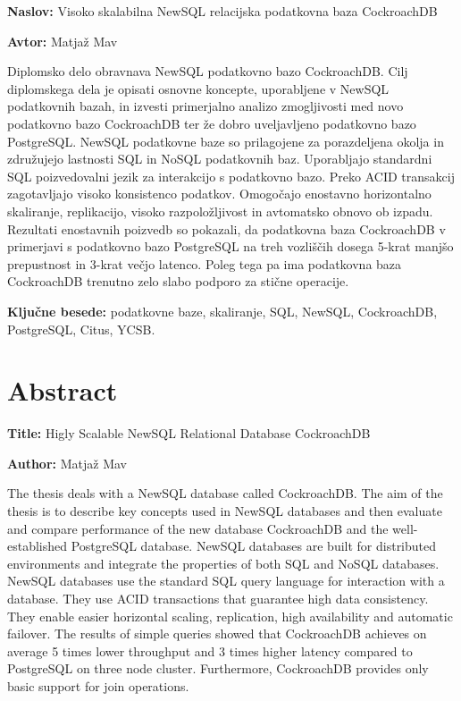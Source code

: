 \documentclass[a4paper, 12pt]{book}
\newcommand{\ttitle}{Visoko skalabilna NewSQL relacijska podatkovna baza CockroachDB}
\newcommand{\ttitleEn}{Higly Scalable NewSQL Relational Database CockroachDB}
\newcommand{\tauthor}{Matjaž Mav}
\newcommand{\tkeywords}{podatkovne baze, skaliranje, SQL, NewSQL, CockroachDB, PostgreSQL, Citus, YCSB}
\newcommand{\clearemptydoublepage}{\newpage{\pagestyle{empty}\cleardoublepage}}
\begin{document}
\noindent\textbf{Naslov:} \ttitle
\bigskip

\noindent\textbf{Avtor:} \tauthor
\bigskip

\noindent Diplomsko delo obravnava NewSQL podatkovno bazo CockroachDB. Cilj diplomskega dela je opisati osnovne koncepte, uporabljene v NewSQL podatkovnih bazah, in izvesti primerjalno analizo zmogljivosti med novo podatkovno bazo CockroachDB ter že dobro uveljavljeno podatkovno bazo PostgreSQL. NewSQL podatkovne baze so prilagojene za porazdeljena okolja in združujejo lastnosti SQL in NoSQL podatkovnih baz. Uporabljajo standardni SQL poizvedovalni jezik za interakcijo s podatkovno bazo. Preko ACID transakcij zagotavljajo visoko konsistenco podatkov. Omogočajo enostavno horizontalno skaliranje, replikacijo, visoko razpoložljivost in avtomatsko obnovo ob izpadu. Rezultati enostavnih poizvedb so pokazali, da podatkovna baza CockroachDB v primerjavi s podatkovno bazo PostgreSQL na treh vozliščih dosega 5-krat manjšo prepustnost in 3-krat večjo latenco. Poleg tega pa ima podatkovna baza CockroachDB trenutno zelo slabo podporo za stične operacije.
\bigskip

\noindent\textbf{Ključne besede:} \tkeywords.
\clearemptydoublepage

\chapter*{Abstract}

\noindent\textbf{Title:} \ttitleEn
\bigskip

\noindent\textbf{Author:} \tauthor
\bigskip

\noindent The thesis deals with a NewSQL database called CockroachDB. The aim of the thesis is to describe key concepts used in NewSQL databases and then evaluate and compare performance of the new database CockroachDB and the well-established PostgreSQL database. NewSQL databases are built for distributed environments and integrate the properties of both SQL and NoSQL databases. NewSQL databases use the standard SQL query language for interaction with a database. They use ACID transactions that guarantee high data consistency. They enable easier horizontal scaling, replication, high availability and automatic failover. The results of simple queries showed that CockroachDB achieves on average 5 times lower throughput and 3 times higher latency compared to PostgreSQL on three node cluster. Furthermore, CockroachDB provides only basic support for join operations.
\bigskip
\end{document}
